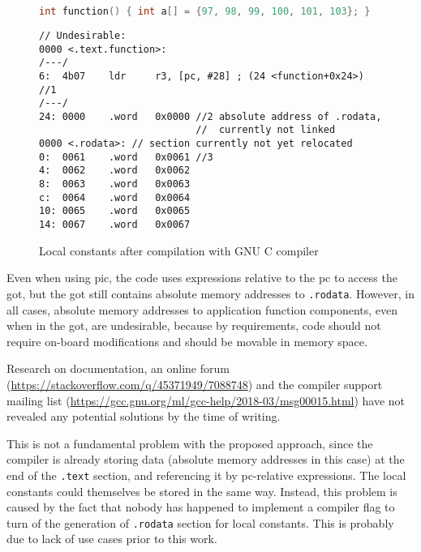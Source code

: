 \begin{figure} [ht]
\begin{lstlisting}[language=C]
int function() { int a[] = {97, 98, 99, 100, 101, 103}; }
\end{lstlisting}
\begin{lstlisting}[style=asm]
// Undesirable:
0000 <.text.function>:
/---/
6:  4b07    ldr     r3, [pc, #28] ; (24 <function+0x24>) //1
/---/
24: 0000    .word   0x0000 //2 absolute address of .rodata,
                           //  currently not linked
0000 <.rodata>: // section currently not yet relocated
0:  0061    .word   0x0061 //3
4:  0062    .word   0x0062
8:  0063    .word   0x0063
c:  0064    .word   0x0064
10: 0065    .word   0x0065
14: 0067    .word   0x0067
\end{lstlisting}
\caption{Local constants after compilation with GNU C compiler}
\label{fig:rodata}
\end{figure}

Even when using \gls{pic}, the code uses expressions relative to the \gls{pc} to access the \gls{got}, but the \gls{got} still contains absolute memory addresses to \texttt{.rodata}. However, in all cases, absolute memory addresses to application function components, even when in the \gls{got}, are undesirable, because by requirements, code should not require on-board modifications and should be movable in memory space.

Research on documentation, an online forum (\url{https://stackoverflow.com/q/45371949/7088748}) and the compiler support mailing list (\url{https://gcc.gnu.org/ml/gcc-help/2018-03/msg00015.html}) have not revealed any potential solutions by the time of writing.

This is not a fundamental problem with the proposed approach, since the compiler is already storing data (absolute memory addresses in this case) at the end of the \texttt{.text} section, and referencing it by \gls{pc}-relative expressions. The local constants could themselves be stored in the same way. Instead, this problem is caused by the fact that nobody has happened to implement a compiler flag to turn of the generation of \texttt{.rodata} section for local constants. This is probably due to lack of use cases prior to this work.

